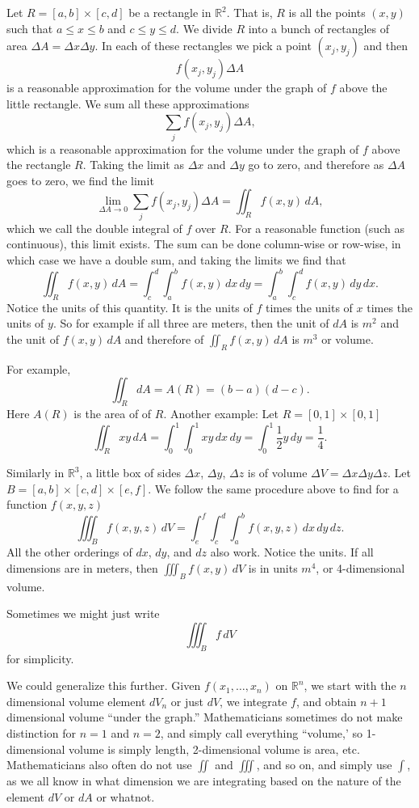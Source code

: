 \documentclass[11pt]{article}
\newcommand{\R}{{\mathbb{R}}}
\begin{document}
Let $R = [a,b] \times [c,d]$ be a rectangle in $\R^2$.  That is, $R$ is all the points
$(x,y)$ such that $a \leq x \leq b$ and $c \leq y \leq d$.
We divide $R$ into a bunch of rectangles of area $\Delta A = \Delta x \Delta y$.
In each of these rectangles we pick a point $(x_j,y_j)$ and then
$$
f(x_j,y_j) \Delta A
$$
is a reasonable approximation for the volume under the graph of $f$ above the little
rectangle.
We sum all these approximations
$$
\sum_j 
f(x_j,y_j) \Delta A ,
$$
which is a reasonable approximation for the volume under the graph of $f$ above the rectangle
$R$.
Taking the
limit as $\Delta x$ and $\Delta y$ go to zero,
and therefore as $\Delta A$ goes to zero,
we find the limit
$$
\lim_{\Delta A \to 0}
\sum_j 
f(x_j,y_j) \Delta A =
\iint_R f(x,y) \, dA ,
$$
which we call the double integral of $f$ over $R$.
For a reasonable function (such as continuous), this limit exists.
The sum can be done column-wise or row-wise, in which case we have a
double sum, and taking the limits we find that
$$
\iint_R f(x,y) \, dA
=
\int_c^d \int_a^b f(x,y) \, dx \, dy
=
\int_a^b \int_c^d f(x,y) \, dy \, dx .
$$
Notice the units of this quantity.  It is the units of $f$ times the units of $x$ times
the units of $y$.  So for example if all three are meters, then the unit of $dA$ is $m^2$ and
the unit of
$f(x,y) \, dA$
and therefore of
$\iint_R f(x,y) \, dA$
is $m^3$ or volume.

For example,
$$
\iint_R dA = A(R) = (b-a)(d-c) .
$$
Here $A(R)$ is the area of of $R$.  Another example:  Let $R = [0,1] \times [0,1]$
$$
\iint_R xy\, dA =
\int_0^1 \int_0^1 xy \, dx \, dy
=
\int_0^1 \frac{1}{2} y \, dy
= \frac{1}{4}.
$$

Similarly in $\R^3$, a little box of sides $\Delta x$, $\Delta y$, $\Delta z$
is of volume $\Delta V = \Delta x \Delta y \Delta z$.  
Let $B = [a,b] \times [c,d] \times [e,f]$.
We follow the same procedure above to find for a function $f(x,y,z)$
$$
\iiint_B f(x,y,z) \, dV
=
\int_e^f \int_c^d \int_a^b f(x,y,z) \, dx \, dy \, dz .
$$
All the other orderings of $dx$, $dy$, and $dz$ also work.
Notice the units.  If all dimensions are in meters, then
$\iiint_B f(x,y) \, dV$ is in units $m^4$, or 4-dimensional volume.

Sometimes we might just write
$$
\iiint_B f \, dV
$$
for simplicity.

We could generalize this further. Given $f(x_1,\ldots,x_n)$ on $\R^n$, we start with
the $n$ dimensional volume element $dV_n$ or just $dV$, we integrate $f$, and obtain
$n+1$ dimensional volume ``under the graph.''
Mathematicians sometimes do not make distinction for $n=1$ and $n=2$, and simply call
everything ``volume,' so 1-dimensional volume is simply length, 2-dimensional volume is
area, etc.
Mathematicians also often do not use $\iint$ and $\iiint$,
and so on, and simply use $\int$,
as we all know in what dimension we are integrating based on the nature of
the element $dV$ or $dA$ or whatnot.
\end{document}
